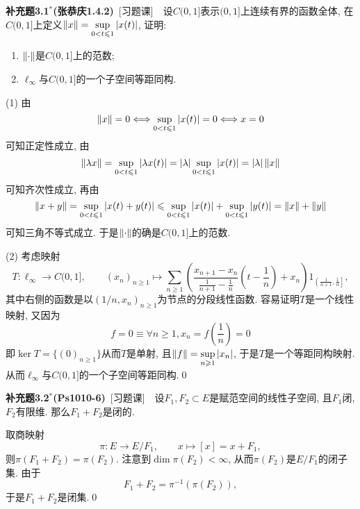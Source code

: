 	\textbf{补充题3.1$ ^* $(张恭庆1.4.2)}\ [习题课]\ \ 设$ C(0,1] $表示$ (0,1] $上连续有界的函数全体, 在$ C(0,1] $上定义$ \left\| x \right\|=\sup\limits_{0<t\leqslant 1}\left| x(t) \right|  $, 证明:
	\begin{enumerate}[(1)]
	\item $ \left\| \cdot \right\| $是$ C(0,1] $上的范数;
	\item $ \ell_\infty $与$ C(0,1] $的一个子空间等距同构.
	\end{enumerate}
	
	\begin{Proof}
	(1) 由
	\[
	\left\| x \right\|=0\Longleftrightarrow\sup_{0<t\leqslant 1}\left| x(t) \right| =0\Longleftrightarrow x=0
	\]
	可知正定性成立, 由
	\[
	\left\| \lambda x \right\|=\sup_{0<t\leqslant 1}\left| \lambda x(t) \right| =\left| \lambda \right| \sup_{0<t\leqslant 1}\left| x(t) \right| =\left| \lambda \right| \left\| x \right\|
	\]
	可知齐次性成立, 再由
	\[
	\left\| x+y \right\|=\sup_{0<t\leqslant 1}\left| x(t)+y(t) \right| \leqslant\sup_{0<t\leqslant 1}\left| x(t) \right| +\sup_{0<t\leqslant 1}\left| y(t) \right| =\left\| x \right\|+\left\| y \right\|
	\]
	可知三角不等式成立. 于是$ \left\| \cdot \right\| $的确是$ C(0,1] $上的范数.
	
	(2) 考虑映射
	\[
	T : \ell_\infty\to C(0,1],\qquad (x_n)_{n\geqslant 1}\mapsto\sum_{n\geqslant 1}\left(\frac{x_{n+1}-x_n}{\frac{1}{n+1}-\frac{1}{n}}\left(t-\frac{1}{n}\right)+x_n\right)1_{\left( \frac{1}{n+1},\frac{1}{n} \right]},
	\]
	其中右侧的函数是以$ (1/n,x_n)_{n\geqslant 1} $为节点的分段线性函数. 容易证明$ T $是一个线性映射, 又因为
	\[
	f=0\equiv \forall n\geqslant 1, x_n=f\left(\frac{1}{n}\right)=0
	\]
	即$ \ker T=\{ (0)_{n\geqslant 1} \} $从而$ T $是单射, 且$ \left\| f \right\|=\sup\limits_{n\geqslant 1}\left| x_n \right|  $, 于是$ T $是一个等距同构映射. 从而$ \ell_\infty $与$ C(0,1] $的一个子空间等距同构.\qed
	\end{Proof}

	\textbf{补充题3.2$ ^* $(Ps1010-6)}\ [习题课]\ \ 设$ F_1,F_2\subset E $是赋范空间的线性子空间, 且$ F_1 $闭, $ F_2 $有限维. 那么$ F_1+F_2 $是闭的.
	\begin{Proof}
	取商映射
	\[
	\pi : E\to E/F_1,\qquad x\mapsto [x]=x+F_1,
	\]
	则$ \pi(F_1+F_2)=\pi(F_2) $. 注意到$ \dim\pi(F_2)<\infty $, 从而$ \pi(F_2) $是$ E/F_1 $的闭子集. 由于
	\[
	F_1+F_2=\pi^{-1}(\pi(F_2)),
	\]
	于是$ F_1+F_2 $是闭集.\qed
	\end{Proof}

